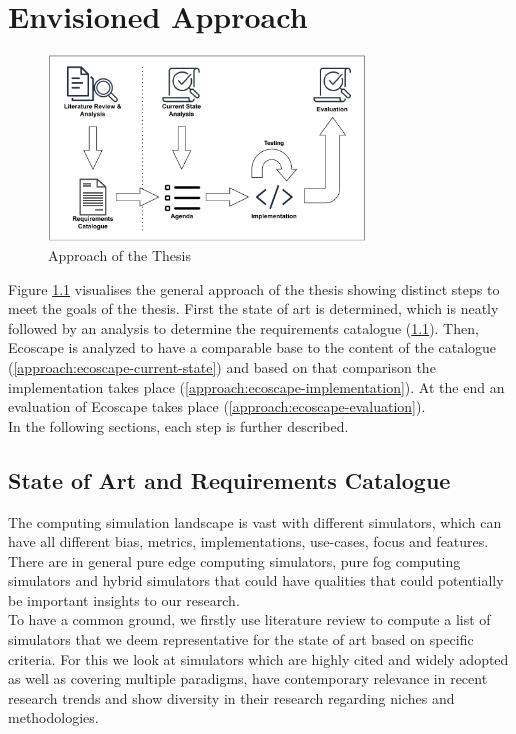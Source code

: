 \chapter{Envisioned Approach}
\begin{figure}[H]
  \centering
  \includegraphics[width=0.75\textwidth]{img/approach_figure.pdf}
  \caption{Approach of the Thesis}
  \label{fig:approach_figure}
\end{figure}

Figure \ref{fig:approach_figure} visualises the general approach of the thesis showing distinct steps to meet the goals of the thesis.
First the state of art is determined, which is neatly followed by an analysis to determine the requirements catalogue (\ref{approach:state-of-art}).
Then, Ecoscape is analyzed to have a comparable base to the content of the catalogue (\ref{approach:ecoscape-current-state}) and based on that comparison the implementation takes place (\ref{approach:ecoscape-implementation}).
At the end an evaluation of Ecoscape takes place (\ref{approach:ecoscape-evaluation}).
\\
In the following sections, each step is further described.
\section{State of Art and Requirements Catalogue}\label{approach:state-of-art}
The computing simulation landscape is vast with different simulators, which can have all different bias, metrics, implementations, use-cases, focus and features.
There are in general pure edge computing simulators, pure fog computing simulators and hybrid simulators that could have qualities that could potentially be important insights to our research. 
\ \\
To have a common ground, we firstly use literature review to compute a list of simulators that we deem representative for the state of art based on specific criteria.
For this we look at simulators which are highly cited and widely adopted as well as covering multiple paradigms, have contemporary relevance in recent research trends and show diversity in their research regarding niches and methodologies.


